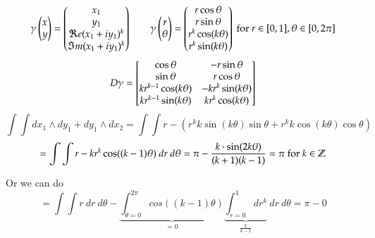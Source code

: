 \[\gamma\begin{pmatrix} x \\ y \end{pmatrix} = \begin{pmatrix} x_1 \\ y_1 \\ \Re e(x_1+iy_1)^k \\ \Im m(x_1+iy_1)^k \end{pmatrix} \qquad \gamma\begin{pmatrix} r \\ \theta \end{pmatrix} = \begin{pmatrix} r\cos\theta \\ r \sin\theta \\ r^k \cos(k\theta) \\ r^k \sin(k\theta) \end{pmatrix}\text{ for } r\in [0,1], \theta\in [0,2\pi]\]
\[D\gamma = \begin{bmatrix} \cos\theta & -r\sin\theta \\ \sin\theta & r\cos\theta \\ kr^{k-1}\cos(k\theta) & -kr^k \sin(k\theta) \\ kr^{k-1}\sin(k\theta) & kr^k \cos(k\theta) \end{bmatrix}\]
\[\int \int dx_1\land dy_1 + dy_1\land dx_2 = \int \int r - \left( r^k k \sin(k\theta) \sin\theta + r^{k}k\cos(k\theta)\cos\theta \right)\]
\[=\int \int r - k r^k \cos((k-1)\theta)\ dr\ d\theta=\pi - \frac{k\cdot \sin(2k\theta)}{(k+1)(k-1)}=\pi \text{ for }k\in\Z\]

Or we can do
\[=\int\int r\ dr\ d\theta - \underbrace{\int_{\theta=0}^{2\pi}cos((k-1)\theta)}_{=0}\underbrace{\int_{r=0}^1 dr^k}_{\frac{k}{k-1}}\ dr\ d\theta = \pi - 0\]
